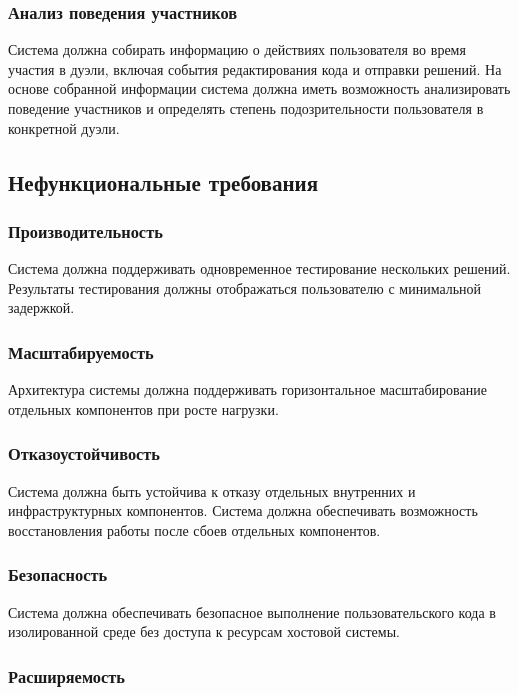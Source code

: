 \subsubsection*{Анализ поведения участников}
Система должна собирать информацию о действиях пользователя во время участия в дуэли,
включая события редактирования кода и отправки решений.
На основе собранной информации система должна иметь возможность анализировать поведение участников
и определять степень подозрительности пользователя в конкретной дуэли.

\subsection{Нефункциональные требования}

\subsubsection*{Производительность}

Система должна поддерживать одновременное тестирование нескольких решений.
Результаты тестирования должны отображаться пользователю с минимальной задержкой.

\subsubsection*{Масштабируемость}

Архитектура системы должна поддерживать горизонтальное масштабирование отдельных компонентов при росте нагрузки.

\subsubsection*{Отказоустойчивость}

Система должна быть устойчива к отказу отдельных внутренних и инфраструктурных компонентов.
Система должна обеспечивать возможность восстановления работы после сбоев отдельных компонентов.

\subsubsection*{Безопасность}

Система должна обеспечивать безопасное выполнение пользовательского кода в изолированной среде без доступа к ресурсам хостовой системы.

\subsubsection*{Расширяемость}

